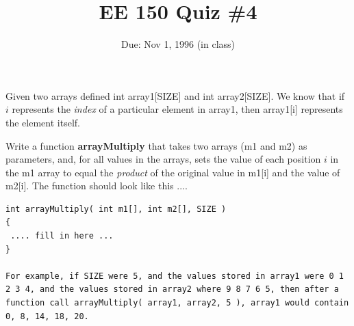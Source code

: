 \setcounter{page}{1}



\title{EE 150 Quiz \#4}
\author{Due: Nov 1, 1996 (in class)}
\date{}
\maketitle

Given two arrays defined int array1[SIZE] and int array2[SIZE].  We
know that if $i$ represents the {\em index} of a particular element
in array1, then array1[i] represents the element itself.

Write a function {\bf arrayMultiply} that takes two arrays (m1 and
m2) as parameters, and, for all values in the arrays, sets the value 
of each position $i$ in the m1 array  to equal the {\em product} of
the original value in m1[i] and the value of m2[i].   The function
should look like this ....

\begin{verbatim}
int arrayMultiply( int m1[], int m2[], SIZE )
{
 .... fill in here ... 
}

For example, if SIZE were 5, and the values stored in array1 were 0 1
2 3 4, and the values stored in array2 where 9 8 7 6 5, then after a
function call arrayMultiply( array1, array2, 5 ), array1 would contain
0, 8, 14, 18, 20. 
\end{verbatim}


